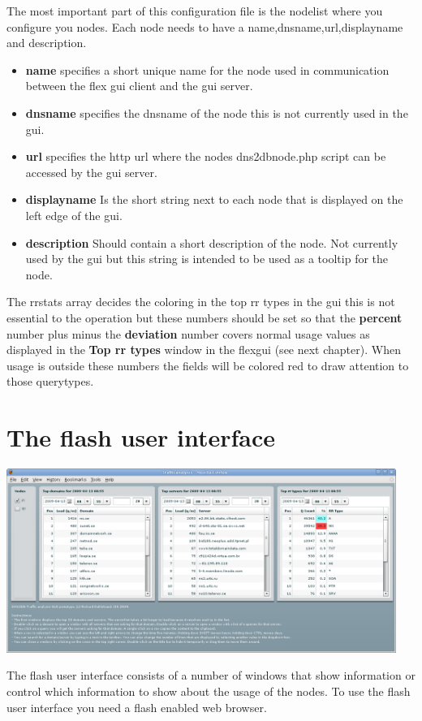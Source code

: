 \documentclass[a4paper]{article}
\begin{document}
The most important part of this configuration file is the nodelist where you configure you nodes.
Each node needs to have a name,dnsname,url,displayname and description.
\begin{itemize}
\item \textbf{name} specifies a short unique name for the node used in communication between the flex gui client and the gui server.
\item \textbf{dnsname} specifies the dnsname of the node this is not currently used in the gui.
\item \textbf{url} specifies the http url where the nodes dns2dbnode.php script can be accessed by the gui server.
\item \textbf{displayname} Is the short string next to each node that is displayed on the left edge of the gui.
\item \textbf{description} Should contain a short description of the node. Not currently used by the gui but this string is intended to be used as a tooltip for the node.
\end{itemize}

The rrstats array decides the coloring in the top rr types in the gui 
this is not essential to the operation but these numbers should be set so that 
the \textbf{percent} number  plus minus the \textbf{deviation}
number covers normal usage values as displayed in the \textbf{Top rr types} window in the flexgui (see next chapter). When usage is outside these numbers the fields will be colored red to draw attention to those querytypes.





\newpage
\section{The flash user interface}
\includegraphics[width=5.0in]{../screendumps/1.png}

The flash user interface consists of a number of windows that show 
information or control which information to show about the usage of the nodes.
To use the flash user interface you need a flash enabled web browser. 
\end{document}
